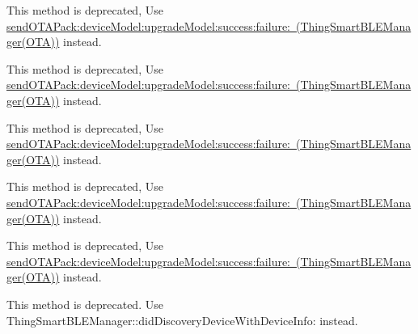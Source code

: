 \begin{DoxyRefList}
\label{deprecated__deprecated000162}%
%
This method is deprecated, Use \mbox{\hyperlink{category_thing_smart_b_l_e_manager_07_o_t_a_08_a0ad37c54867c7353fed357ae1b494eae}{send\+OTAPack\+:device\+Model\+:upgrade\+Model\+:success\+:failure\+: (\+Thing\+Smart\+BLEManager(\+OTA))}} instead.  
\item[(OTA) Member \mbox{\hyperlink{category_thing_smart_b_l_e_manager_07_o_t_a_08_a9d80ddcda7c81938fe795590ed4e1b44}{\mbox{[}Thing\+Smart\+BLEManager(OTA) send\+OTAPack\+:pid\+:ota\+Data\+:ota\+Type\+:ota\+Version\+:success\+:failure\+:\mbox{]}}} ]\label{deprecated__deprecated000164}%
%
This method is deprecated, Use \mbox{\hyperlink{category_thing_smart_b_l_e_manager_07_o_t_a_08_a0ad37c54867c7353fed357ae1b494eae}{send\+OTAPack\+:device\+Model\+:upgrade\+Model\+:success\+:failure\+: (\+Thing\+Smart\+BLEManager(\+OTA))}} instead. 

\label{deprecated__deprecated000159}%
%
This method is deprecated, Use \mbox{\hyperlink{category_thing_smart_b_l_e_manager_07_o_t_a_08_a0ad37c54867c7353fed357ae1b494eae}{send\+OTAPack\+:device\+Model\+:upgrade\+Model\+:success\+:failure\+: (\+Thing\+Smart\+BLEManager(\+OTA))}} instead.  
\item[(OTA) Member \mbox{\hyperlink{category_thing_smart_b_l_e_manager_07_o_t_a_08_a15a8aa81d946f0df0f5b520bcdbb8321}{\mbox{[}Thing\+Smart\+BLEManager(OTA) send\+OTAPack\+:pid\+:ota\+Data\+:success\+:failure\+:\mbox{]}}} ]\label{deprecated__deprecated000163}%
%
This method is deprecated, Use \mbox{\hyperlink{category_thing_smart_b_l_e_manager_07_o_t_a_08_a0ad37c54867c7353fed357ae1b494eae}{send\+OTAPack\+:device\+Model\+:upgrade\+Model\+:success\+:failure\+: (\+Thing\+Smart\+BLEManager(\+OTA))}} instead. 

\label{deprecated__deprecated000158}%
%
This method is deprecated, Use \mbox{\hyperlink{category_thing_smart_b_l_e_manager_07_o_t_a_08_a0ad37c54867c7353fed357ae1b494eae}{send\+OTAPack\+:device\+Model\+:upgrade\+Model\+:success\+:failure\+: (\+Thing\+Smart\+BLEManager(\+OTA))}} instead.  
\item[Member \mbox{\hyperlink{protocol_thing_smart_b_l_e_manager_delegate-p_a68118c6a3626fb20d3fa8a13a84d2a42}{\mbox{[}Thing\+Smart\+BLEManager\+Delegate-\/p did\+Discovery\+Device\+With\+UUID\+:product\+Key\+:\mbox{]}}} ]\label{deprecated__deprecated000131}%
%
This method is deprecated. Use Thing\+Smart\+BLEManager\+::did\+Discovery\+Device\+With\+Device\+Info\+: instead. 


\end{DoxyRefList}

